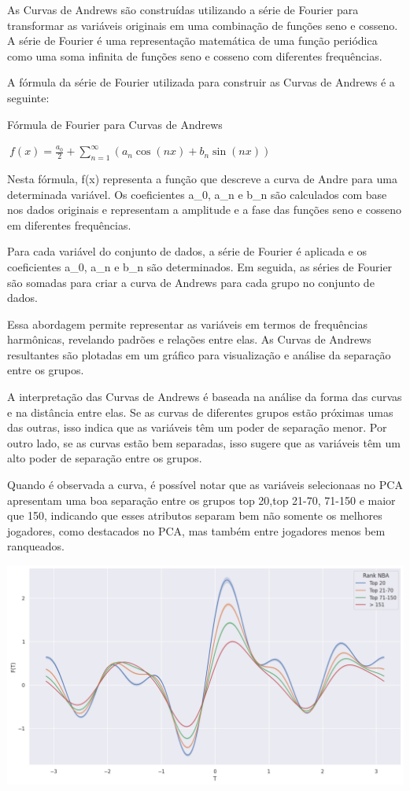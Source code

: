 \documentclass[
]{book}
\begin{document}
As Curvas de Andrews são construídas utilizando a série de Fourier para transformar as variáveis originais em uma combinação de funções seno e cosseno. A série de Fourier é uma representação matemática de uma função periódica como uma soma infinita de funções seno e cosseno com diferentes frequências.

A fórmula da série de Fourier utilizada para construir as Curvas de Andrews é a seguinte:

Fórmula de Fourier para Curvas de Andrews

\(\ f(x) = \frac{a_0}{2} + \sum_{n=1}^{\infty} \left( a_n \cos(nx) + b_n \sin(nx) \right)\)

Nesta fórmula, f(x) representa a função que descreve a curva de Andre para uma determinada variável. Os coeficientes a\_0, a\_n e b\_n são calculados com base nos dados originais e representam a amplitude e a fase das funções seno e cosseno em diferentes frequências.

Para cada variável do conjunto de dados, a série de Fourier é aplicada e os coeficientes a\_0, a\_n e b\_n são determinados. Em seguida, as séries de Fourier são somadas para criar a curva de Andrews para cada grupo no conjunto de dados.

Essa abordagem permite representar as variáveis em termos de frequências harmônicas, revelando padrões e relações entre elas. As Curvas de Andrews resultantes são plotadas em um gráfico para visualização e análise da separação entre os grupos.

A interpretação das Curvas de Andrews é baseada na análise da forma das curvas e na distância entre elas. Se as curvas de diferentes grupos estão próximas umas das outras, isso indica que as variáveis têm um poder de separação menor. Por outro lado, se as curvas estão bem separadas, isso sugere que as variáveis têm um alto poder de separação entre os grupos.

Quando é observada a curva, é possível notar que as variáveis selecionaas no PCA apresentam uma boa separação entre os grupos top 20,top 21-70, 71-150 e maior que 150, indicando que esses atributos separam bem não somente os melhores jogadores, como destacados no PCA, mas também entre jogadores menos bem ranqueados.

\includegraphics{imagens/7.png}
\end{document}
